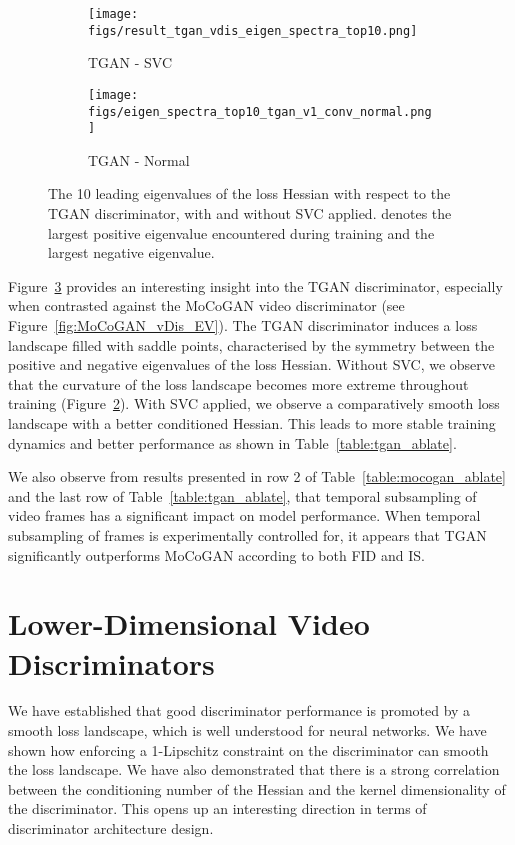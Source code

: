 \documentclass[a4paper,fleqn]{cas-sc}
\begin{document}
\begin{figure}[pos=!h]
    \centering
    \begin{subfigure}[t]{0.5\textwidth}
        \centering
        \texttt{[image: figs/result\_tgan\_vdis\_eigen\_spectra\_top10.png]}
        \caption{TGAN - SVC}
        \label{fig:TGAN_SVC_EV}
    \end{subfigure}\begin{subfigure}[t]{0.5\textwidth}
        \centering
        \texttt{[image: figs/eigen\_spectra\_top10\_tgan\_v1\_conv\_normal.png]}
        \caption{TGAN - Normal}
        \label{fig:TGAN_Normal_EV}
    \end{subfigure}
\caption{The 10 leading eigenvalues of the loss Hessian with respect to the TGAN discriminator, with and without SVC applied.   denotes the largest positive eigenvalue encountered during training and  the largest negative eigenvalue.} 
    \label{fig:TGAN_EV}
\end{figure}

Figure~\ref{fig:TGAN_EV} provides an interesting insight into the TGAN discriminator, especially when contrasted against the MoCoGAN video discriminator (see Figure~\ref{fig:MoCoGAN_vDis_EV}). The TGAN discriminator induces a loss landscape filled with saddle points, characterised by the symmetry between the positive and negative eigenvalues of the loss Hessian. Without SVC, we observe that the curvature of the loss landscape becomes more extreme throughout training (Figure~\ref{fig:TGAN_Normal_EV}). With SVC applied, we observe a comparatively smooth loss landscape with a better conditioned Hessian. This leads to more stable training dynamics and better performance as shown in Table~\ref{table:tgan_ablate}. 

We also observe from results presented in row 2 of Table~\ref{table:mocogan_ablate} and the last row of Table~\ref{table:tgan_ablate}, that temporal subsampling of video frames has a significant impact on model performance. When temporal subsampling of frames is experimentally controlled for, it appears that TGAN significantly outperforms MoCoGAN according to both FID and IS.

\section{Lower-Dimensional Video Discriminators}
\label{sec:ldvd}
We have established that good discriminator performance is promoted by a smooth loss landscape, which is well understood for neural networks. We have shown how enforcing a 1-Lipschitz constraint on the discriminator can smooth the loss landscape. We have also demonstrated that there is a strong correlation between the conditioning number of the Hessian and the kernel dimensionality of the discriminator. This opens up an interesting direction in terms of discriminator architecture design. 
\end{document}
